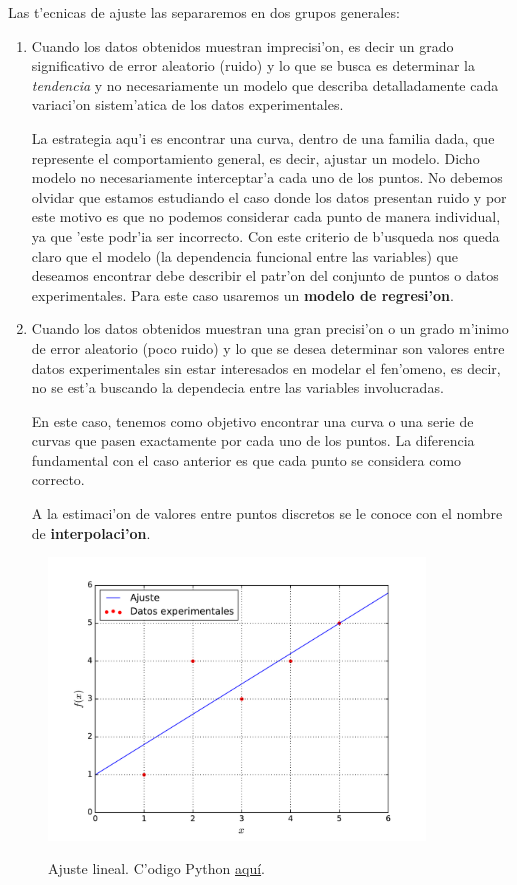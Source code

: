 Las t'ecnicas de ajuste las separaremos en dos grupos generales:
\begin{enumerate}
\item Cuando los datos obtenidos muestran imprecisi'on, es decir un grado significativo de error aleatorio (ruido) y lo que se busca es determinar la \textit{tendencia} y no necesariamente un modelo que describa detalladamente cada variaci'on sistem'atica de los datos experimentales.

La estrategia aqu'i es encontrar una curva, dentro de una familia dada, que represente el comportamiento general, es decir, ajustar un modelo. Dicho modelo no necesariamente interceptar'a cada uno de los  puntos. No debemos olvidar que estamos estudiando el caso donde los datos presentan ruido y por este motivo es que no podemos considerar cada punto de manera individual, ya que 'este podr'ia ser incorrecto. Con este criterio de b'usqueda nos queda claro que el modelo (la dependencia funcional entre las variables) que deseamos encontrar debe describir el patr'on del conjunto de puntos o datos experimentales. Para este caso usaremos un \textbf{modelo de regresi'on}.

\item Cuando los datos obtenidos muestran una gran precisi'on o un grado m'inimo de error aleatorio (poco ruido) y lo que se desea determinar son valores entre datos experimentales sin estar interesados en modelar el fen'omeno, es decir, no se est'a buscando la dependecia entre las variables involucradas.
 
	En este caso, tenemos como objetivo encontrar una curva o una serie de curvas que pasen exactamente por cada uno de los puntos. La diferencia fundamental con el caso anterior es que cada punto se considera como correcto. 
	
A la estimaci'on de valores entre puntos discretos se le conoce con el nombre de \textbf{interpolaci'on}.
\end{enumerate}

\begin{figure}[h!]
\begin{center}
\includegraphics[width=10cm]{figs/fig-mmc.pdf}\label{intmc}
\caption{Ajuste lineal. C'odigo Python \href{https://github.com/gfrubi/Lab/blob/master/python/fig-mmc.py}{aqu\'i}.}
\end{center}
\end{figure}


